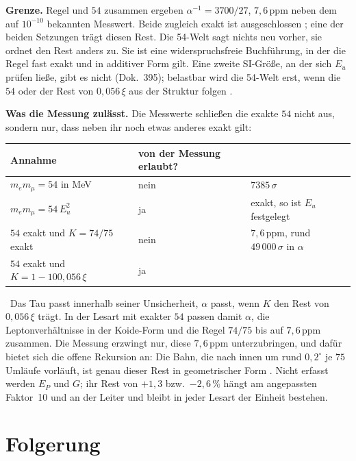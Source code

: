 \textbf{Grenze.} Regel und $54$ zusammen ergeben $\alpha^{-1}=3700/27$, $7{,}6$\,ppm neben dem auf
$10^{-10}$ bekannten Messwert. Beide zugleich exakt ist ausgeschlossen \XM; eine der beiden
Setzungen trägt diesen Rest. Die 54-Welt sagt nichts neu vorher, sie ordnet den Rest anders zu. Sie
ist eine widerspruchsfreie Buchführung, in der die Regel fast exakt und in additiver Form gilt.
Eine zweite SI-Größe, an der sich $E_u$ prüfen ließe, gibt es nicht (Dok.~395); belastbar wird die
54-Welt erst, wenn die $54$ oder der Rest von $0{,}056\,\xi$ aus der Struktur folgen \SM.

\textbf{Was die Messung zulässt.} Die Messwerte schließen die exakte $54$ nicht aus, sondern nur, dass
neben ihr noch etwas anderes exakt gilt:
\begin{center}
\begin{tabular}{@{}lll@{}}
\toprule
\textbf{Annahme} & \textbf{von der Messung erlaubt?} & \\
\midrule
$m_em_\mu=54$ in MeV & nein & $7385\,\sigma$ \\
$m_em_\mu=54\,E_u^2$ & ja & exakt, so ist $E_u$ festgelegt \\
$54$ exakt und $K=74/75$ exakt & nein & $7{,}6$\,ppm, rund $49\,000\,\sigma$ in $\alpha$ \\
$54$ exakt und $K=1-100{,}056\,\xi$ & ja & \\
\bottomrule
\end{tabular}
\end{center}
\KM\ Das Tau passt innerhalb seiner Unsicherheit, $\alpha$ passt, wenn $K$ den Rest von $0{,}056\,\xi$
trägt. In der Lesart mit exakter $54$ passen damit $\alpha$, die Leptonverhältnisse in der Koide-Form
und die Regel $74/75$ bis auf $7{,}6$\,ppm zusammen. Die Messung erzwingt nur, diese $7{,}6$\,ppm
unterzubringen, und dafür bietet sich die offene Rekursion an: Die Bahn, die nach innen um rund
$0{,}2^\circ$ je $75$ Umläufe vorläuft, ist genau dieser Rest in geometrischer Form \SM. Nicht erfasst
werden $E_P$ und $G$; ihr Rest von $+1{,}3$ bzw.\ $-2{,}6\,\%$ hängt am angepassten Faktor~10 und an der
Leiter und bleibt in jeder Lesart der Einheit bestehen.

\section{Folgerung}

